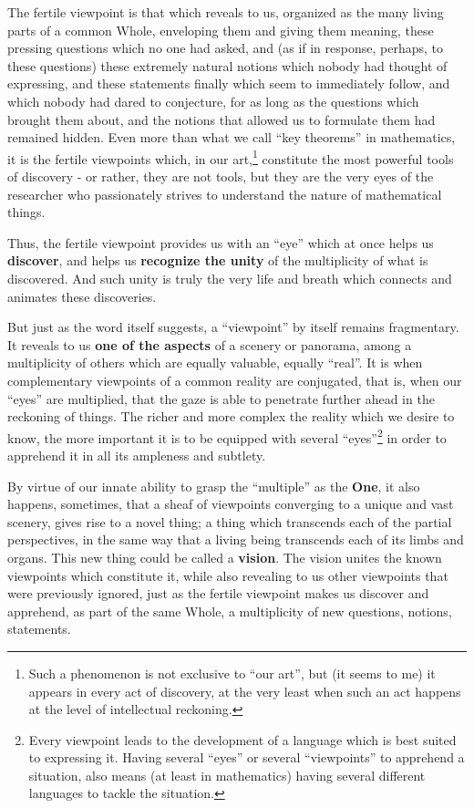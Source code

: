 The fertile viewpoint is that which reveals to us, organized as the many living parts of a
common Whole, 
enveloping them and giving them meaning, these pressing questions which no one had asked,
and (as if in response, perhaps, to these questions) these extremely natural notions which
nobody had thought of expressing, and these statements finally which seem to immediately
follow, and which nobody had dared to conjecture, for as long as the questions which
brought them about, and the notions that allowed us to formulate them had remained hidden.
Even more than what we call ``key theorems'' in mathematics, it is the fertile viewpoints
which, in our art,\footnote{Such a phenomenon is not exclusive to ``our art'', but (it
seems to me) it appears in every act of discovery, at the very least when such an act
happens at the level of intellectual reckoning.} constitute the most powerful tools of
discovery - or rather, they are
not tools, but they are the very eyes of the researcher who passionately strives to
understand the nature of mathematical things. 

Thus, the fertile viewpoint provides us with an ``eye'' which at once helps us 
\textbf{discover}, and helps us \textbf{recognize the unity} of 
the multiplicity of what is discovered. And such unity is truly the very life and breath
which connects and animates these discoveries. 

But just as the word itself suggests, a ``viewpoint'' by itself remains fragmentary. 
It reveals to us \textbf{one of the aspects}
of a scenery or panorama, among a multiplicity of others which are equally valuable,
equally ``real''. It is when complementary viewpoints of a common reality 
are conjugated, that is, when our ``eyes'' are multiplied, that the gaze is able to
penetrate further ahead in the reckoning of things. 
The richer and more complex the reality which we desire to know, the more important it is
to be equipped with several ``eyes''\footnote{Every viewpoint leads to the development of
a language which is best suited to expressing it. Having several ``eyes'' or several
``viewpoints'' to apprehend a situation, also means (at least in mathematics) having 
several different languages to tackle the situation.} in order to apprehend it in all its ampleness and
subtlety. 

By virtue of our innate ability to grasp the ``multiple'' as the \textbf{One},
it also happens, sometimes, that a sheaf of viewpoints 
converging to a unique and vast scenery, gives rise to a novel thing; a thing which
transcends each of the partial perspectives, in the same way that a living being
transcends
each of its limbs and organs. This new thing could be called a \textbf{vision}.
The vision unites the known viewpoints which constitute it, while also revealing to us
other viewpoints that were previously ignored, just as the fertile viewpoint makes us
discover and apprehend, as part of the same Whole, a multiplicity of new questions,
notions, statements. 

